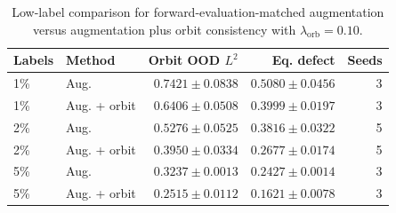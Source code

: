 \begin{table}[t]
\centering
\small
\caption{Training compute accounting for the headline 2\% N64 Galilean runs. Forward/backward counts are computed from logged optimizer steps. Transformed-sample counts use the actual alternating minibatch sizes 16 and 4 for the 20-example labeled subset, including iterator restarts; wall-clock minutes are estimated from immutable RNG checkpoint timestamps for these legacy cached runs, and new runs now write \texttt{train\_wall\_seconds} directly. Relative train time is normalized to the supervised augmentation baseline; batch-level forward counts are matched but backward-pass counts differ.}
\label{tab:n64-compute}
\end{table}

\begin{table}[t]
\centering
\small
\caption{Low-label comparison for forward-evaluation-matched augmentation versus augmentation plus orbit consistency with \(\lambda_{\mathrm{orb}}=0.10\).}
\label{tab:n64-label-efficiency}
\begin{tabular}{llrrr}
\toprule
Labels & Method & Orbit OOD \(L^2\) & Eq. defect & Seeds \\
\midrule
1\% & Aug. & \(0.7421\pm0.0838\) & \(0.5080\pm0.0456\) & 3 \\
1\% & Aug. + orbit & \(\mathbf{0.6406\pm0.0508}\) & \(\mathbf{0.3999\pm0.0197}\) & 3 \\
2\% & Aug. & \(0.5276\pm0.0525\) & \(0.3816\pm0.0322\) & 5 \\
2\% & Aug. + orbit & \(\mathbf{0.3950\pm0.0334}\) & \(\mathbf{0.2677\pm0.0174}\) & 5 \\
5\% & Aug. & \(0.3237\pm0.0013\) & \(0.2427\pm0.0014\) & 3 \\
5\% & Aug. + orbit & \(\mathbf{0.2515\pm0.0112}\) & \(\mathbf{0.1621\pm0.0078}\) & 3 \\
\bottomrule
\end{tabular}
\end{table}

